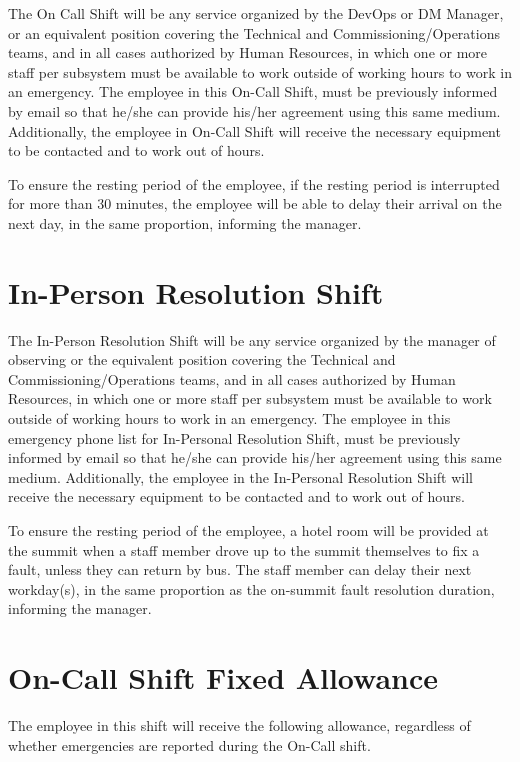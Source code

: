The On Call Shift will be any service organized by the DevOps or DM Manager, or an equivalent position covering the Technical and Commissioning/Operations teams, and in all cases authorized by Human Resources, in which one or more staff per subsystem must be available to work outside of working hours to work in an emergency.
The employee in this On-Call Shift, must be previously informed by email so that he/she can provide his/her agreement using this same medium. Additionally, the employee in On-Call Shift will receive the necessary equipment to be contacted and to work out of hours.

To ensure the resting period of the employee, if the resting period is interrupted for more than 30 minutes, the employee will be able to delay their arrival on the next day, in the same proportion, informing the manager.

\section{In-Person Resolution Shift}

The In-Person Resolution Shift will be any service organized by the manager of observing or the equivalent position covering the Technical and Commissioning/Operations teams, and in all cases authorized by Human Resources, in which one or more staff per subsystem must be available to work outside of working hours to work in an emergency.
The employee in this emergency phone list for In-Personal Resolution Shift, must be previously informed by email so that he/she can provide his/her agreement using this same medium. Additionally, the employee in the In-Personal Resolution Shift will receive the necessary equipment to be contacted and to work out of hours.

To ensure the resting period of the employee, a hotel room will be provided at the summit when a staff member drove up to the summit themselves to fix a fault, unless they can return by bus.  The staff member can delay their next workday(s), in the same proportion as the on-summit fault resolution duration, informing the manager.

\section{On-Call Shift Fixed Allowance}

The employee in this shift will receive the following allowance, regardless of whether emergencies are reported during the On-Call shift.

